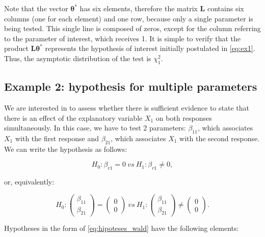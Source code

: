 \documentclass[Review,sagev,times, doublespace]{sagej}
\begin{document}
Note that the vector $\boldsymbol{\theta^{*}}$ has six elements, therefore the matrix $\boldsymbol{L}$ contains six columns (one for each element) and one row, because only a single parameter is being tested. This single line is composed of zeros, except for the column referring to the parameter of interest, which receives 1. It is simple to verify that the product $\boldsymbol{L}\boldsymbol{\theta^{*}}$ represents the hypothesis of interest initially postulated in \autoref{eq:ex1}. Thus, the asymptotic distribution of the test is $\chi^2_1$.

\subsection{Example 2: hypothesis for multiple parameters}\label{sec:ex2}

We are interested in to assess whether there is sufficient evidence to state that there is an effect of the explanatory variable $X_1$ on both responses simultaneously. 
In this case, we have to test 2 parameters: $\beta_{11}$, which associates $X_1$ with the first response and $\beta_{21}$, which associates $X_1$ with the second response. 
We can write the hypothesis as follows:

\begin{equation}
\label{eq:ex2}
H_0: \beta_{r1} = 0 \ vs \ H_1: \beta_{r1} \neq 0,
\end{equation}

\noindent or, equivalently:

$$
H_0: 
\begin{pmatrix}
\beta_{11} \\ 
\beta_{21}
\end{pmatrix} 
= 
\begin{pmatrix}
0 \\ 
0
\end{pmatrix}
\ vs \ 
H_1: 
\begin{pmatrix}
\beta_{11} \\ 
\beta_{21}
\end{pmatrix} 
\neq
\begin{pmatrix}
0 \\ 
0 
\end{pmatrix}.
$$

Hypotheses in the form of \autoref{eq:hipoteses_wald} have the following elements:
\end{document}
